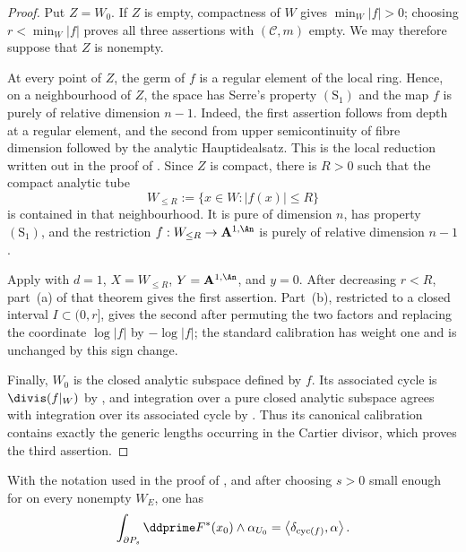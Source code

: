 \begin{proof}
Put $Z=W_0$.  If $Z$ is empty, compactness of $W$ gives
$\min_W|f|>0$; choosing $r<\min_W|f|$ proves all three assertions with
$(\mathscr C,m)$ empty.  We may therefore suppose that $Z$ is nonempty.

At every point of $Z$, the germ of $f$ is a regular element of the local
ring.  Hence, on a neighbourhood of $Z$, the space has Serre's property
$(\mathrm S_1)$ and the map $f$ is purely of relative dimension $n-1$.
Indeed, the first assertion follows from depth at a regular element, and
the second from upper semicontinuity of fibre dimension followed by the
analytic Hauptidealsatz.  This is the local reduction written out in the
proof of \cite[Lemma~16.7.5]{CLD25}.  Since $Z$ is compact, there is
$R>0$ such that the compact analytic tube
\[
                 W_{\leq R}:=\{x\in W:|f(x)|\leq R\}
\]
is contained in that neighbourhood.  It is pure of dimension $n$, has
property $(\mathrm S_1)$, and the restriction
$f:W_{\leq R}\to\mathbf A^{1,\An}$ is purely of relative dimension
$n-1$.

Apply \cite[Theorem~14.7.2]{CLD25} with $d=1$,
$X=W_{\leq R}$, $Y=\mathbf A^{1,\An}$, and $y=0$.  After decreasing
$r<R$, part~(a) of that theorem gives the first assertion.  Part~(b),
restricted to a closed interval $I\subset(0,r]$, gives the second after
permuting the two factors and replacing the coordinate $\log|f|$ by
$-\log|f|$; the standard calibration has weight one and is unchanged by
this sign change.

Finally, $W_0$ is the closed analytic subspace defined by $f$.  Its
associated cycle is $\divis(f|_W)$ by \cite[\S13.7.1]{CLD25}, and
integration over a pure closed analytic subspace agrees with integration
over its associated cycle by \cite[Proposition~16.6.3]{CLD25}.  Thus its
canonical calibration contains exactly the generic lengths occurring in
the Cartier divisor, which proves the third assertion.
\end{proof}

\begin{lemma}
\label{lem:ch18-boundary-divisor}
With the notation used in the proof of
, and after choosing $s>0$ small enough for
 on every nonempty $W_E$, one has
\begin{equation}
\label{eq:ch18-boundary-divisor}
 \int_{\partial P_s}\ddprime F^*(x_0)\wedge\alpha_{U_0}
       =\left\langle\delta_{\operatorname{cyc}(f)},\alpha\right\rangle .
\end{equation}
\end{lemma}

